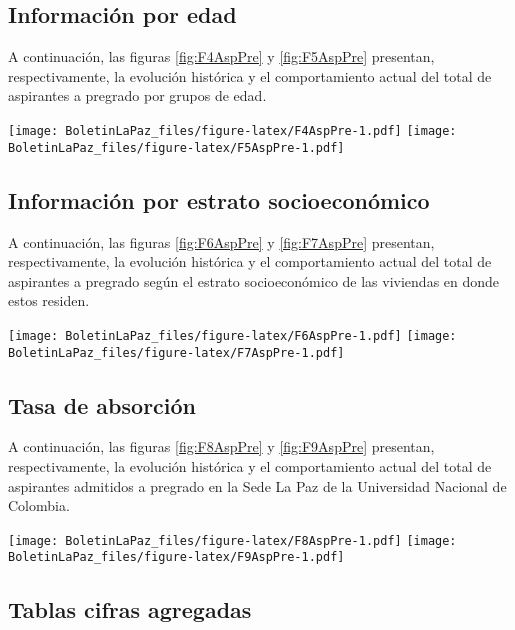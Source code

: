 \documentclass[
]{book}
\begin{document}
\hypertarget{informaciuxf3n-por-edad}{%
\subsection{Información por edad}\label{informaciuxf3n-por-edad}}

A continuación, las figuras \ref{fig:F4AspPre} y \ref{fig:F5AspPre} presentan, respectivamente, la evolución histórica y el comportamiento actual del total de aspirantes a pregrado por grupos de edad.

\texttt{[image: BoletinLaPaz\_files/figure-latex/F4AspPre-1.pdf]}
\texttt{[image: BoletinLaPaz\_files/figure-latex/F5AspPre-1.pdf]}

\hypertarget{informaciuxf3n-por-estrato-socioeconuxf3mico}{%
\subsection{Información por estrato socioeconómico}\label{informaciuxf3n-por-estrato-socioeconuxf3mico}}

A continuación, las figuras \ref{fig:F6AspPre} y \ref{fig:F7AspPre} presentan, respectivamente, la evolución histórica y el comportamiento actual del total de aspirantes a pregrado según el estrato socioeconómico de las viviendas en donde estos residen.

\texttt{[image: BoletinLaPaz\_files/figure-latex/F6AspPre-1.pdf]}
\texttt{[image: BoletinLaPaz\_files/figure-latex/F7AspPre-1.pdf]}

\hypertarget{tasa-de-absorciuxf3n}{%
\subsection{Tasa de absorción}\label{tasa-de-absorciuxf3n}}

A continuación, las figuras \ref{fig:F8AspPre} y \ref{fig:F9AspPre} presentan, respectivamente, la evolución histórica y el comportamiento actual del total de aspirantes admitidos a pregrado en la Sede La Paz de la Universidad Nacional de Colombia.

\texttt{[image: BoletinLaPaz\_files/figure-latex/F8AspPre-1.pdf]}
\texttt{[image: BoletinLaPaz\_files/figure-latex/F9AspPre-1.pdf]}

\hypertarget{tablas-cifras-agregadas}{%
\subsection{Tablas cifras agregadas}\label{tablas-cifras-agregadas}}
\end{document}
